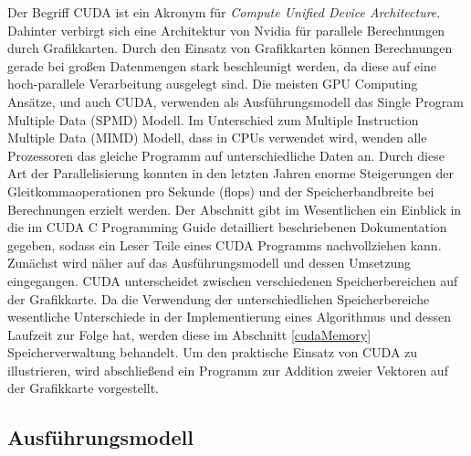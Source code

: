 Der Begriff CUDA ist ein Akronym für \textit{Compute Unified Device Architecture}. Dahinter verbirgt sich eine Architektur von Nvidia für parallele Berechnungen durch Grafikkarten. Durch den Einsatz von Grafikkarten können Berechnungen gerade bei großen Datenmengen stark beschleunigt werden, da diese auf eine hoch-parallele Verarbeitung ausgelegt sind. Die meisten GPU Computing Ansätze, und auch CUDA, verwenden als Ausführungsmodell das Single Program Multiple Data (SPMD) Modell. Im Unterschied zum Multiple Instruction Multiple Data (MIMD) Modell, dass in CPUs verwendet wird, wenden alle Prozessoren das gleiche Programm auf unterschiedliche Daten an. Durch diese Art der Parallelisierung konnten in den letzten Jahren enorme Steigerungen der Gleitkommaoperationen pro Sekunde (flops) und der Speicherbandbreite bei Berechnungen erzielt werden.\newline
Der Abschnitt gibt im Wesentlichen ein Einblick in die im CUDA C Programming Guide \cite{cud2012} detailliert beschriebenen Dokumentation gegeben, sodass ein Leser Teile eines CUDA Programms nachvollziehen kann. Zunächst wird näher auf das Ausführungsmodell und dessen Umsetzung eingegangen. CUDA unterscheidet zwischen verschiedenen Speicherbereichen auf der Grafikkarte. Da die Verwendung der unterschiedlichen Speicherbereiche wesentliche Unterschiede in der Implementierung eines Algorithmus und dessen Laufzeit zur Folge hat, werden diese im Abschnitt \ref{cudaMemory} Speicherverwaltung behandelt. Um den praktische Einsatz von CUDA zu illustrieren, wird abschließend ein Programm zur Addition zweier Vektoren auf der Grafikkarte vorgestellt.

\subsection{Ausführungsmodell}

